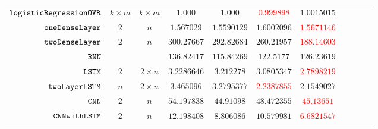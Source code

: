 {\begin {table}[H]
\begin{center}
{\begin{tabular}{| >{\tiny}r | c | c | c | c | c | c | c | c | c | c  }
         $  \mathtt{logisticRegressionOVR}$    & $k \times m$ &  $ k \times m $ &  $ 1.000  $  &  $ 1.000 $ & \textcolor{red}{$ 0.999898$} & $ 1.0015015 $ \\
         $  \mathtt{oneDenseLayer}$ & $2$   & $ n $   &  $ 1.567029  $  &  {$ 1.5590129 $} & $1.6002096$ & \textcolor{red}{$ 1.5671146 $}  \\
         {$ \mathtt{twoDenseLayer}$} & $2$ &  $ n $ &  $ 300.27667 $  &  $ 292.82684 $ & $ 260.21957 $ & \textcolor{red}{$ 188.14603 $}  \\
         $  \mathtt{RNN}$           & $  $  & $ $ &  $ 136.82417 $  &  $ 115.84269 $ & $ 122.5177 $ & $ 126.23619 $  \\
         $  \mathtt{LSTM}$          & $ 2 $   &  $ 2 \times n $  &  $ 3.2286646  $  &  $ 3.212278 $ & $3.0805347$ & \textcolor{red}{${2.7898219}$}  \\
         $  \mathtt{twoLayerLSTM}$  & $ n $ &  $ 2 \times n $  &  $ 3.465096  $  &  $3.2795377$ & \textcolor{red}{${2.2387855}$} & $2.1549027$  \\
         $ \mathtt{CNN}$ & $2$ &  $ n $ &  $54.197838$  &  $44.91098$ & $48.472355$ & \textcolor{red}{$45.13651$}  \\
         $ \mathtt{CNNwithLSTM}$ & $2$ &  $ n $ &  $ 12.198408  $  &  $  8.806086$ & $ 10.579981 $ & \textcolor{red}{$ 6.6821547 $} \\
         \hline \hline
        \end{tabular}
}
\end{center}
\end{table}
}


